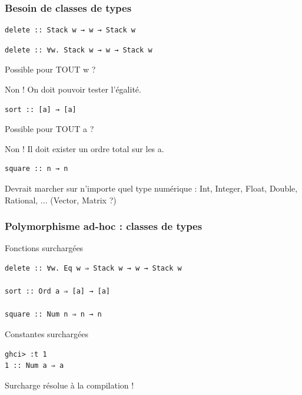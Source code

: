 \documentclass[10pt]{beamer}
\begin{document}
\begin{frame}[fragile]
\frametitle{Besoin de classes de types}
\begin{verbatim}
delete :: Stack w → w → Stack w
\end{verbatim}

\pause

\begin{verbatim}
delete :: ∀w. Stack w → w → Stack w
\end{verbatim}

Possible pour TOUT w ?

\pause

Non ! On doit pouvoir tester l'égalité.

\pause

\begin{verbatim}
sort :: [a] → [a]
\end{verbatim}

Possible pour TOUT a ?

\pause

Non ! Il doit exister un ordre total sur les a.

\pause

\begin{verbatim}
square :: n → n
\end{verbatim}

Devrait marcher sur n'importe quel type numérique : Int, Integer, Float,
Double, Rational, ... (Vector, Matrix ?)

\end{frame}




\begin{frame}[fragile]
\frametitle{Polymorphisme ad-hoc : classes de types}
\begin{block}
{Fonctions surchargées}
\begin{verbatim}
delete :: ∀w. Eq w ⇒ Stack w → w → Stack w

sort :: Ord a ⇒ [a] → [a]

square :: Num n ⇒ n → n
\end{verbatim}
\end{block}
\pause
\begin{block}
{Constantes surchargées}
\begin{verbatim}
ghci> :t 1
1 :: Num a ⇒ a
\end{verbatim}
\end{block}
\pause
Surcharge résolue à la compilation !
\end{frame}
\end{document}
